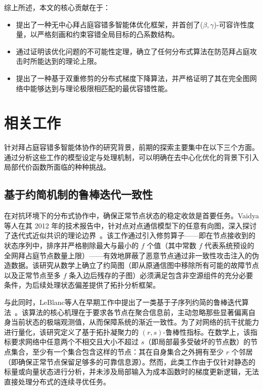 \documentclass[12pt,hyperref,a4paper,UTF8]{ctexart}
\numberwithin{equation}{section}
\numberwithin{figure}{section}
\numberwithin{table}{section}
\begin{document}
综上所述，本文的核心贡献在于：
\begin{itemize}
    \item 提出了一种无中心拜占庭容错多智能体优化框架，并首创了($\beta, \gamma$)-可容许性度量，以严格刻画和约束容错全局目标的凸系数结构。
    \item 通过证明该优化问题的不可能性定理，确立了任何分布式算法在防范拜占庭攻击时所能达到的理论上限。
    \item 提出了一种基于双重修剪的分布式梯度下降算法，并严格证明了其在完全图网络中能够达到与理论极限相匹配的最优容错性能。
\end{itemize}

\section{相关工作}

\quad \quad  针对拜占庭容错多智能体协作的研究背景，前期的探索主要集中在以下三个方面。通过分析这些工作的模型设定与处理机制，可以明确在去中心化优化的背景下引入局部代价函数所面临的种种挑战。

\subsection{基于约简机制的鲁棒迭代一致性}

\quad \quad  在对抗环境下的分布式协作中，确保正常节点状态的稳定收敛是首要任务。Vaidya等人在其 2012 年的技术报告中，针对点对点通信模型下的任意有向图，深入探讨了迭代式近似共识的理论边界~\cite{vaidya2012iterative}。该工作通过引入修剪算子——即在节点接收到的状态序列中，排序并严格剔除最大与最小的 $f$ 个值（其中常数 $f$ 代表系统预设的全网拜占庭节点数量上限）——有效地屏蔽了恶意节点通过非一致性攻击注入的伪造数据。该研究从数学上确立了约简图（即从原通信图中移除所有可能的故障节点以及正常节点至多 $f$ 条入边后残存的子图）必须满足包含非空源组件的充分必要条件，为后续处理状态偏差提供了拓扑分析框架。

与此同时，LeBlanc等人在早期工作中提出了一类基于子序列约简的鲁棒迭代算法~\cite{leblanc2012consensus}。该算法的核心机理在于要求各节点在聚合信息前，主动忽略那些显著偏离自身当前状态的极端观测值，从而保障系统的渐近一致性。为了对网络的抗干扰能力进行量化，该研究定义了基于拓扑凝聚力的 $(r, s)$-鲁棒性指标。在数学上，该指标要求网络中任意两个不相交且大小不超过 $s$（即局部最多受破坏的节点数）的节点集合，至少有一个集合包含这样的节点：其在自身集合之外拥有至少 $r$ 个邻居（即确保正常节点保留足够多的可靠信息源）。然而，此类工作由于仅针对静态的标量或向量状态进行分析，并未涉及局部输入为成本函数时的梯度更新逻辑，无法直接处理分布式的连续寻优任务。
\end{document}
